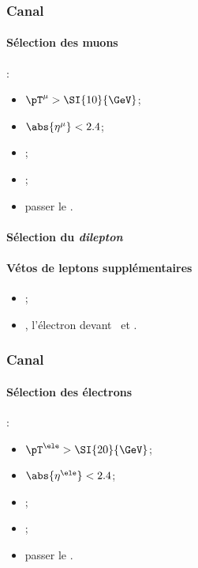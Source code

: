 \subsubsection{Canal \mu\mu}
\paragraph{Sélection des muons}
:
\begin{itemize}
    \item $\pT^{\mu} > \SI{10}{\GeV}$;
    \item $\abs{\eta^{\mu}} < 2.4$;
    \item \Leptondzdxy;
    \item {};
    \item passer le \MediumMuonID.
\end{itemize}
\paragraph{Sélection du \emph{dilepton}}
\AtLeastOneOSPair{\mu\mu}
\IfMoreOnePair
\paragraph{Vétos de leptons supplémentaires}
\LeptonVetoes
\begin{itemize}
    \item \LeptonVetoesSecondMuon;
    \item \LeptonVetoesSecondEle, l'électron devant \PassConversionVeto\ et \LessTwoMissingHitsVertex.
\end{itemize}
\subsubsection{Canal \ele\ele}
\paragraph{Sélection des électrons}
:
\begin{itemize}
    \item $\pT^{\ele} > \SI{20}{\GeV}$;
    \item $\abs{\eta^{\ele}} < 2.4$;
    \item \Leptondzdxy;
    \item {};
    \item passer le \NinetyNineEleMVA.
\end{itemize}
